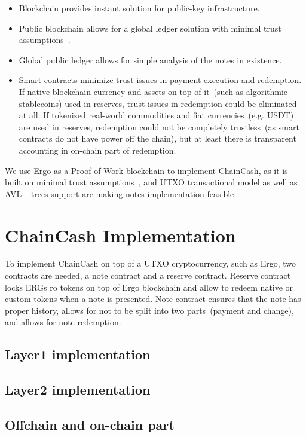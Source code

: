 \documentclass{article}   %
\newcommand{\cc}{ChainCash}
\begin{document}
\begin{itemize}
  \item{} Blockchain provides instant solution for public-key infrastructure.
  \item{} Public blockchain allows for a global ledger solution with minimal trust assumptions~\cite{kya}.
  \item{} Global public ledger allows for simple analysis of the notes in existence.
  \item{} Smart contracts minimize trust issues in payment execution and redemption. If native blockchain currency and assets on top of it~(such as algorithmic stablecoins) used in reserves, trust issues in redemption could be eliminated at all. If tokenized real-world commodities and fiat currencies~(e.g. USDT) are used in reserves, redemption could not be completely trustless~(as smart contracts do not have power off the chain), but at least there is transparent accounting in on-chain part of redemption. 
\end{itemize}

We use Ergo as a Proof-of-Work blockchain to implement \cc{}, as it is built on minimal trust assumptions~\cite{kya}, and UTXO transactional model as well as AVL+ trees support are making notes implementation feasible.


\section{\cc{} Implementation}

To implement \cc{} on top of a UTXO cryptocurrency, such as Ergo, two contracts are needed, a note contract and a reserve contract. Reserve contract locks ERGs ro tokens on top of Ergo blockchain and allow to redeem native or custom tokens when a note is presented. Note contract ensures that the note has
proper history, allows for not to be split into two parts~(payment and change), and allows for note redemption.

\subsection{Layer1 implementation}

\subsection{Layer2 implementation}

\subsection{Offchain and on-chain part}
\end{document}

